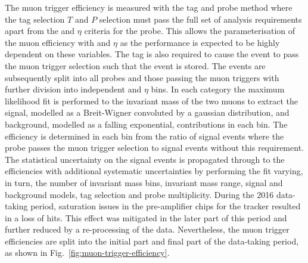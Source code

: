 The muon trigger efficiency \cite{CMS-DP-2017-056} is measured with the tag
and probe method where the tag selection $T$ and $P$ selection must pass the
full set of analysis requirements apart from the \pt and $\eta$ criteria for
the probe. This allows the parameterisation of the muon efficiency with \pt
and $\eta$ as the performance is expected to be highly dependent on these
variables. The tag is also required to cause the event to pass the muon
trigger selection such that the event is stored. The events are subsequently
split into all probes and those passing the muon triggers with further
division into independent \pt and $\eta$ bins. In each category the maximum
likelihood fit is performed to the invariant mass of the two muons to extract
the signal, modelled as a Breit-Wigner convoluted by a gaussian distribution,
and background, modelled as a falling exponential, contributions in each bin.
The efficiency is determined in each bin from the ratio of signal events where
the probe passes the muon trigger selection to signal events without this
requirement. The statistical uncertainty on the signal events is propagated
through to the efficiencies with additional systematic uncertainties by
performing the fit varying, in turn, the number of invariant mass bins,
invariant mass range, signal and background models, tag selection and probe
multiplicity. During the 2016 data-taking period, saturation issues in the
pre-amplifier chips for the tracker resulted in a loss of hits. This effect
was mitigated in the later part of this period and further reduced by a
re-processing of the data. Nevertheless, the muon trigger efficiencies are
split into the initial part and final part of the data-taking period, as shown
in Fig.~\ref{fig:muon-trigger-efficiency}.

